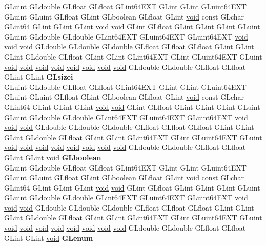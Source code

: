 \begin{DoxyCompactItemize}
\begin{tabbing}
\>GLuint GLdouble GLfloat GLfloat GLint64EXT GLint GLint GLuint64EXT GLuint GLuint GLfloat GLint GLboolean GLfloat GLint \hyperlink{interfacevoid}{void} const GLchar GLint64 GLint GLint GLint \hyperlink{interfacevoid}{void} \hyperlink{interfacevoid}{void} GLint GLfloat GLint GLint GLint GLuint GLuint GLdouble GLdouble GLint64EXT GLuint64EXT GLuint64EXT \hyperlink{interfacevoid}{void} \hyperlink{interfacevoid}{void} \hyperlink{interfacevoid}{void} GLdouble GLdouble GLdouble GLfloat GLfloat GLfloat GLint GLint GLint GLdouble GLfloat GLint GLint GLint64EXT GLint GLuint64EXT GLuint \hyperlink{interfacevoid}{void} \hyperlink{interfacevoid}{void} \hyperlink{interfacevoid}{void} \hyperlink{interfacevoid}{void} \hyperlink{interfacevoid}{void} \hyperlink{interfacevoid}{void} \hyperlink{interfacevoid}{void} \hyperlink{interfacevoid}{void} GLdouble GLdouble GLfloat GLfloat GLint GLint {\bfseries GLsizei}\\
\>GLuint GLdouble GLfloat GLfloat GLint64EXT GLint GLint GLuint64EXT GLuint GLuint GLfloat GLint GLboolean GLfloat GLint \hyperlink{interfacevoid}{void} const GLchar GLint64 GLint GLint GLint \hyperlink{interfacevoid}{void} \hyperlink{interfacevoid}{void} GLint GLfloat GLint GLint GLint GLuint GLuint GLdouble GLdouble GLint64EXT GLuint64EXT GLuint64EXT \hyperlink{interfacevoid}{void} \hyperlink{interfacevoid}{void} \hyperlink{interfacevoid}{void} GLdouble GLdouble GLdouble GLfloat GLfloat GLfloat GLint GLint GLint GLdouble GLfloat GLint GLint GLint64EXT GLint GLuint64EXT GLuint \hyperlink{interfacevoid}{void} \hyperlink{interfacevoid}{void} \hyperlink{interfacevoid}{void} \hyperlink{interfacevoid}{void} \hyperlink{interfacevoid}{void} \hyperlink{interfacevoid}{void} \hyperlink{interfacevoid}{void} \hyperlink{interfacevoid}{void} GLdouble GLdouble GLfloat GLfloat GLint GLint \hyperlink{interfacevoid}{void} {\bfseries GLboolean}\\
\>GLuint GLdouble GLfloat GLfloat GLint64EXT GLint GLint GLuint64EXT GLuint GLuint GLfloat GLint GLboolean GLfloat GLint \hyperlink{interfacevoid}{void} const GLchar GLint64 GLint GLint GLint \hyperlink{interfacevoid}{void} \hyperlink{interfacevoid}{void} GLint GLfloat GLint GLint GLint GLuint GLuint GLdouble GLdouble GLint64EXT GLuint64EXT GLuint64EXT \hyperlink{interfacevoid}{void} \hyperlink{interfacevoid}{void} \hyperlink{interfacevoid}{void} GLdouble GLdouble GLdouble GLfloat GLfloat GLfloat GLint GLint GLint GLdouble GLfloat GLint GLint GLint64EXT GLint GLuint64EXT GLuint \hyperlink{interfacevoid}{void} \hyperlink{interfacevoid}{void} \hyperlink{interfacevoid}{void} \hyperlink{interfacevoid}{void} \hyperlink{interfacevoid}{void} \hyperlink{interfacevoid}{void} \hyperlink{interfacevoid}{void} \hyperlink{interfacevoid}{void} GLdouble GLdouble GLfloat GLfloat GLint GLint \hyperlink{interfacevoid}{void} {\bfseries GLenum}\\

\end{tabbing}
\end{DoxyCompactItemize}
